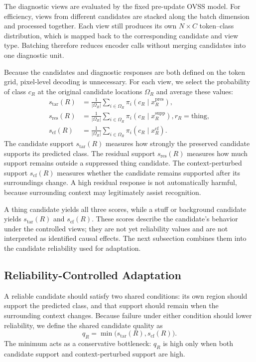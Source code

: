 \documentclass[letterpaper]{article}
\begin{document}
	The diagnostic views are evaluated by the fixed pre-update OVSS model. For efficiency, views from different candidates are stacked along the batch dimension and processed together. Each view still produces its own $N\times C$ token--class distribution, which is mapped back to the corresponding candidate and view type. Batching therefore reduces encoder calls without merging candidates into one diagnostic unit.
	
	Because the candidates and diagnostic responses are both defined on the token grid, pixel-level decoding is unnecessary. For each view, we select the probability of class $c_R$ at the original candidate locations $\Omega_R$ and average these values:
	\begin{align}
		s_{\mathrm{tar}}(R)
		&=
		\frac{1}{|\Omega_R|}
		\sum_{i\in\Omega_R}
		\pi_i
		\left(
		c_R\mid x_R^{\mathrm{pres}}
		\right),
		\\
		s_{\mathrm{res}}(R)
		&=
		\frac{1}{|\Omega_R|}
		\sum_{i\in\Omega_R}
		\pi_i
		\left(
		c_R\mid x_R^{\mathrm{supp}}
		\right), r_R=\mathrm{thing},
		\\
		s_{\mathrm{cf}}(R)
		&=
		\frac{1}{|\Omega_R|}
		\sum_{i\in\Omega_R}
		\pi_i
		\left(
		c_R\mid x_R^{\mathrm{cf}}
		\right).
	\end{align}
	The candidate support $s_{\mathrm{tar}}(R)$ measures how strongly the preserved candidate supports its predicted class. The residual support $s_{\mathrm{res}}(R)$ measures how much support remains outside a suppressed thing candidate. The context-perturbed support $s_{\mathrm{cf}}(R)$ measures whether the candidate remains supported after its surroundings change. A high residual response is not automatically harmful, because surrounding context may legitimately assist recognition.
	
	A thing candidate yields all three scores, while a stuff or background candidate yields $s_{\mathrm{tar}}(R)$ and $s_{\mathrm{cf}}(R)$. These scores describe the candidate's behavior under the controlled views; they are not yet reliability values and are not interpreted as identified causal effects. The next subsection combines them into the candidate reliability used for adaptation.
	
	\subsection{Reliability-Controlled Adaptation}
	\label{sec:reliability-adaptation}
	
	A reliable candidate should satisfy two shared conditions: its own region should support the predicted class, and that support should remain when the surrounding context changes. Because failure under either condition should lower reliability, we define the shared candidate quality as
	\begin{equation}
		q_R
		=
		\min
		\bigl(
		s_{\mathrm{tar}}(R),
		s_{\mathrm{cf}}(R)
		\bigr).
	\end{equation}
	The minimum acts as a conservative bottleneck: $q_R$ is high only when both candidate support and context-perturbed support are high.
	
\end{document}
